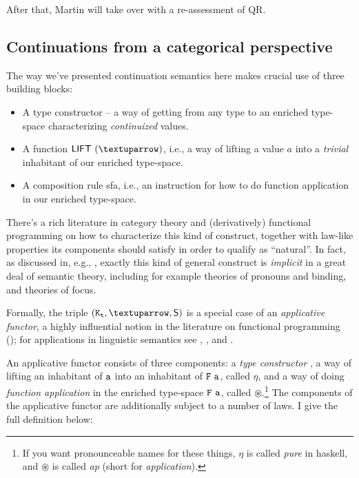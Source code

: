 \documentclass[nols,twoside,nofonts,nobib,nohyper]{tufte-handout}
\begin{document}
After that, Martin will take over with a re-assessment of QR.

\printbibliography

\begin{appendices}

  \section{Continuations from a categorical perspective}

  The way we've presented continuation semantics here makes crucial use of three
  building blocks:

  \begin{itemize}

      \item A type
  constructor  -- a way of getting from any type  to an
      enriched type-space characterizing \textit{continuized} values.

      \item A function $\ml{LIFT} (↑)$, i.e., a way of lifting a value $a$ into a
      \textit{trivial} inhabitant of our enriched type-space.

      \item A composition rule \acf{sfa}, i.e., an
  instruction for how to do function application in our enriched type-space.

      \end{itemize}

  There's a rich literature in category theory and (derivatively) functional
  programming on how to characterize this kind of construct, together with
  law-like properties its components should satisfy in order to qualify as
  \enquote{natural}. In fact, as discussed in, e.g.,
  \cite{charlow2018,elliott2019applicatives}, exactly this kind of general
  construct is \textit{implicit} in a great deal of semantic theory, including
  for example theories of pronouns and binding, and theories of focus.

  Formally, the triple $(\type{K_{t}},↑,\ml{S})$ is a special case of an \textit{applicative functor}, a
  highly influential notion in the literature on functional programming
  (\citealt{mcbridePaterson2008}); for applications in linguistic semantics see
  \cite{kiselyov2017}, \cite{charlow2018}, and \cite{elliott2019applicatives}.

  An applicative functor consists of three components: a \textit{type
    constructor} , a way of lifting an inhabitant of $\mathtt{a}$ into an
  inhabitant of $\type{F a}$, called $η$, and a way of doing \textit{function
    application} in the enriched type-space $\type{F a}$, called
  $⊛$.\footnote{If you want pronounceable names for these things, $η$ is called
    \textit{pure} in haskell, and $⊛$ is called \textit{ap} (short for
    \textit{application}).} The components of the applicative functor are
  additionally subject to a number of laws. I give the full definition below:


\end{appendices}
\end{document}

